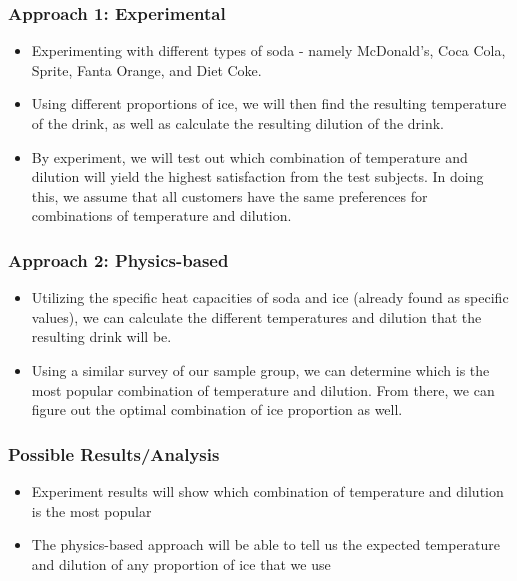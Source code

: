 \documentclass[compress,handout,10pt]{beamer}
\let\olditem\item
\renewcommand{\item}{\setlength{\itemsep}{0.5\baselineskip}\olditem}
\begin{document}
\begin{frame}
    \frametitle{Approach 1: Experimental}

\begin {itemize}
\item Experimenting with different types of soda - namely  McDonald's, Coca Cola, Sprite, Fanta Orange, and Diet Coke.
\item Using different proportions of ice, we will then find the resulting temperature of the drink, as well as calculate the resulting dilution of the drink. 
\item By experiment, we will test out which combination of temperature and dilution will yield the highest satisfaction from the test subjects. In doing this, we assume that all customers have the same preferences for combinations of temperature and dilution.
\end{itemize}

\end{frame}


\begin{frame}
    \frametitle{Approach 2: Physics-based}

\begin {itemize}
\item Utilizing the specific heat capacities of soda and ice (already found as specific values), we can calculate the different temperatures and dilution that the resulting drink will be.
\item Using a similar survey of our sample group, we can determine which is the most popular combination of temperature and dilution. From there, we can figure out the optimal combination of ice proportion as well.
\end{itemize}

\end{frame}
 

\begin{frame}
    \frametitle{Possible Results/Analysis}
\begin{itemize}
\item Experiment results will show which combination of temperature and dilution is the most popular
\item The physics-based approach will be able to tell us the expected temperature and dilution of any proportion of ice that we use
\end{itemize}
\end{frame}
\end{document}
